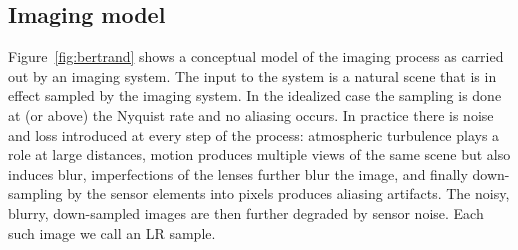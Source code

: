 \subsection{Imaging model}\label{subsec:imaging-model}
Figure~\ref{fig:bertrand} shows a conceptual model of the imaging process as carried out by an imaging system.
%
The input to the system is a natural scene that is in effect sampled by the imaging system.
%
In the idealized case the sampling is done at (or above) the Nyquist rate and no aliasing occurs.
%
In practice there is noise and loss introduced at every step of the process: atmospheric turbulence plays a role at large distances, motion produces multiple views of the same scene but also induces blur, imperfections of the lenses further blur the image, and finally down-sampling by the sensor elements into pixels produces aliasing artifacts.
%
The noisy, blurry, down-sampled images are then further degraded by sensor noise.
%
Each such image we call an LR sample.
